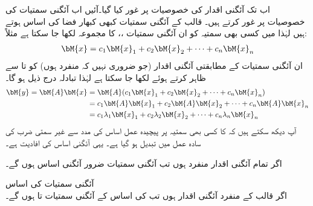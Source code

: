 اب تک آئگنی اقدار کی خصوصیات پر غور کیا گیا۔آئیں اب آئگنی سمتیات کی خصوصیات پر غور کرتے ہیں۔ قالب  کے آئگنی سمتیات  کبھی  کبھار فضا  کی اساس ہوتے ہیں لہٰذا  میں کسی بھی سمتیہ  کو ان آئگنی سمتیات ،،  کا مجموعہ لکھا جا سکتا ہے مثلاً:
\begin{align}
\bM{x}=c_1\bM{x}_1+c_2\bM{x}_2+\cdots+c_n\bM{x}_n
\end{align}
ان آئگنی سمتیات کے مطابقتی آئگنی اقدار (جو ضروری نہیں کہ منفرد ہوں) کو  تا  سے ظاہر کرتے ہوئے
  لکھا جا سکتا ہے لہٰذا تبادلہ  درج ذیل ہو گا۔
\begin{gather}
\begin{aligned}
\bM{y}=\bM{A}\bM{x}&=\bM{A}(c_1\bM{x}_1+c_2\bM{x}_2+\cdots+c_n\bM{x}_n)\\
&=c_1\bM{A}\bM{x}_1+c_2\bM{A}\bM{x}_2+\cdots+c_n\bM{A}\bM{x}_n\\
&=c_1\lambda_1\bM{x}_1+c_2\lambda_2\bM{x}_2+\cdots+c_n\lambda_n\bM{x}_n
\end{aligned}
\end{gather}
آپ دیکھ سکتے ہیں کہ  کا کسی بھی سمتیہ  پر پیچیدہ عمل اساس کی مدد سے  غیر سمتی ضرب کی سادہ عمل میں تبدیل ہو گیا ہے۔ یہی آئگنی اساس کی افادیت ہے۔

اگر تمام آئگنی اقدار منفرد  ہوں تب آئگنی سمتیات ضرور آئگنی اساس ہوں گے۔

\quad آئگنی سمتیات کی اساس\\
اگر  قالب  کے  منفرد آئگنی اقدار ہوں تب  کی اساس  کے آئگنی سمتیات  تا  ہوں گے۔

